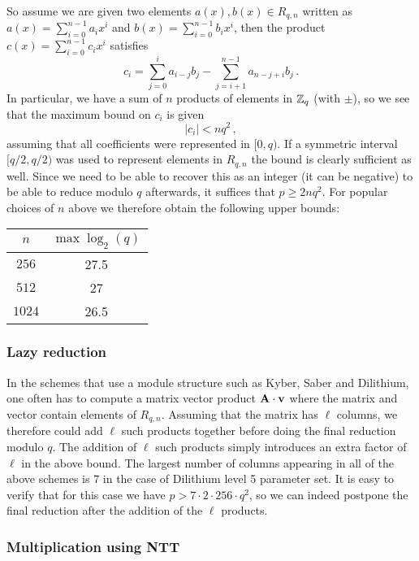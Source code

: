 So assume we are given two elements  $a(x), b(x) \in R_{q,n}$ written as $a(x) = \sum_{i = 0}^{n-1} a_i x^i$
and $b(x) = \sum_{i = 0}^{n-1} b_i x^i$, then the product $c(x) = \sum_{i = 0}^{n-1} c_i x^i$ satisfies
\[  c_i = \sum_{j = 0}^{i} a_{i -j} b_j  - \sum_{j = i+1}^{n-1} a_{n-j+i} b_{j}  \, . \]
In particular, we have a sum of $n$ products of elements
in $\mathbb{Z}_q$ (with $\pm$), so we see that the maximum bound on $c_i$ is given 
\[ |c_i| < n q^2 \, , \]
assuming that all coefficients were represented in $[0,q)$.  If a symmetric interval $[q/2, q/2)$ was used to 
represent elements in $R_{q, n}$ the bound is clearly sufficient as well.  
Since we need to be able to recover this as an integer (it can be negative) to be able to reduce modulo $q$ afterwards,
it suffices that $p \geq 2 n q^2$.  For popular choices of $n$ above we therefore obtain the following upper bounds:
\begin{center}
\begin{tabular}{|c|c|}
\hline
$n$ & $\max \log_2(q)$ \\
\hline
$256$ &  27.5 \\
$512$ &   27 \\
$1024$ &   26.5 \\
\hline
\end{tabular}
\end{center}

\subsubsection{Lazy reduction} In the schemes that use a module structure such as Kyber, Saber and Dilithium, 
one often has to compute 
a matrix vector product $\mathbf{A} \cdot \mathbf{v}$ where the matrix and vector contain elements of $R_{q,n}$.
Assuming that the matrix has $\ell$ columns, we therefore could add $\ell$ such products together before
doing the final reduction modulo $q$.  The addition of $\ell$ such products simply introduces an extra 
factor of $\ell$ in the above bound.  The largest number of columns appearing in all of the above schemes
is $7$ in the case of Dilithium level 5 parameter set.  It is easy to verify that for this case we have
$p > 7 \cdot 2 \cdot 256 \cdot q^2$, so we can indeed postpone the final reduction after the addition 
of the $\ell$ products.

\subsubsection{Multiplication using NTT}

